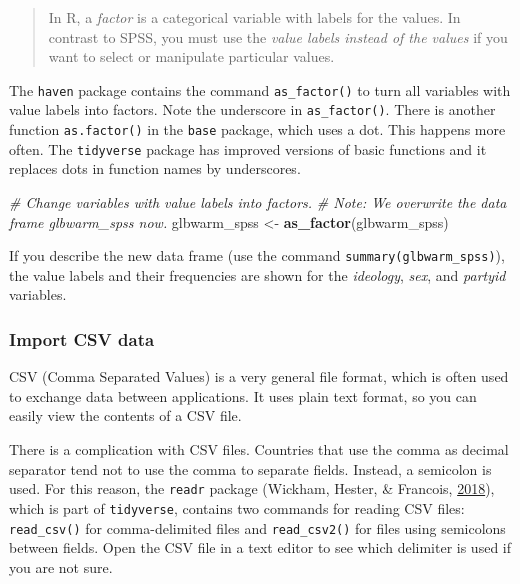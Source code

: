 \documentclass[doc,floatsintext]{apa6}
\newenvironment{Shaded}{\begin{snugshade}}{\end{snugshade}}
\newcommand{\KeywordTok}[1]{\textcolor[rgb]{0.13,0.29,0.53}{\textbf{#1}}}
\newcommand{\StringTok}[1]{\textcolor[rgb]{0.31,0.60,0.02}{#1}}
\newcommand{\CommentTok}[1]{\textcolor[rgb]{0.56,0.35,0.01}{\textit{#1}}}
\newcommand{\NormalTok}[1]{#1}
\begin{document}
\begin{quote}
In R, a \emph{factor} is a categorical variable with labels for the
values. In contrast to SPSS, you must use the \emph{value labels instead
of the values} if you want to select or manipulate particular values.
\end{quote}

The \texttt{haven} package contains the command \texttt{as\_factor()} to
turn all variables with value labels into factors. Note the underscore
in \texttt{as\_factor()}. There is another function \texttt{as.factor()}
in the \texttt{base} package, which uses a dot. This happens more often.
The \texttt{tidyverse} package has improved versions of basic functions
and it replaces dots in function names by underscores.

\begin{Shaded}
\begin{Highlighting}[]
\CommentTok{# Change variables with value labels into factors.}
\CommentTok{# Note: We overwrite the data frame glbwarm_spss now.}
\NormalTok{glbwarm_spss <-}\StringTok{ }\KeywordTok{as_factor}\NormalTok{(glbwarm_spss)}
\end{Highlighting}
\end{Shaded}

If you describe the new data frame (use the command
\texttt{summary(glbwarm\_spss)}), the value labels and their frequencies
are shown for the \emph{ideology}, \emph{sex}, and \emph{partyid}
variables.

\subsubsection{Import CSV data}\label{import-csv-data}

CSV (Comma Separated Values) is a very general file format, which is
often used to exchange data between applications. It uses plain text
format, so you can easily view the contents of a CSV file.

There is a complication with CSV files. Countries that use the comma as
decimal separator tend not to use the comma to separate fields. Instead,
a semicolon is used. For this reason, the \texttt{readr} package
(Wickham, Hester, \& Francois, \protect\hyperlink{ref-R-readr}{2018}),
which is part of \texttt{tidyverse}, contains two commands for reading
CSV files: \texttt{read\_csv()} for comma-delimited files and
\texttt{read\_csv2()} for files using semicolons between fields. Open
the CSV file in a text editor to see which delimiter is used if you are
not sure.
\end{document}
